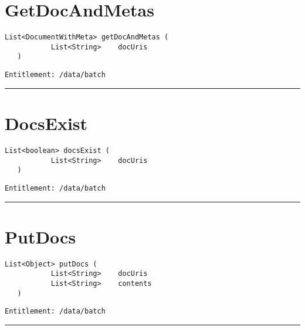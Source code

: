 \section{GetDocAndMetas}
\label{Api:GetDocAndMetas}
\begin{lstlisting}[style=nonumbers]
   List<DocumentWithMeta> getDocAndMetas (
           List<String>    docUris
   )
\end{lstlisting}
\begin{Verbatim}[formatcom=\color{Maroon}]
  Entitlement: /data/batch
\end{Verbatim}



\rule{12cm}{2pt}
\section{DocsExist}
\label{Api:DocsExist}
\begin{lstlisting}[style=nonumbers]
   List<boolean> docsExist (
           List<String>    docUris
   )
\end{lstlisting}
\begin{Verbatim}[formatcom=\color{Maroon}]
  Entitlement: /data/batch
\end{Verbatim}



\rule{12cm}{2pt}
\section{PutDocs}
\label{Api:PutDocs}
\begin{lstlisting}[style=nonumbers]
   List<Object> putDocs (
           List<String>    docUris
           List<String>    contents
   )
\end{lstlisting}
\begin{Verbatim}[formatcom=\color{Maroon}]
  Entitlement: /data/batch
\end{Verbatim}



\rule{12cm}{2pt}
